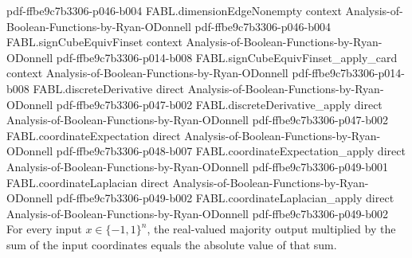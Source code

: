 \begin{theorem}
  {pdf-ffbe9c7b3306-p046-b004}
\proofstep
  {FABL.dimensionEdgeNonempty}
  {context}
  {Analysis-of-Boolean-Functions-by-Ryan-ODonnell}
  {pdf-ffbe9c7b3306-p046-b004}
\proofstep
  {FABL.signCubeEquivFinset}
  {context}
  {Analysis-of-Boolean-Functions-by-Ryan-ODonnell}
  {pdf-ffbe9c7b3306-p014-b008}
\proofstep
  {FABL.signCubeEquivFinset_apply_card}
  {context}
  {Analysis-of-Boolean-Functions-by-Ryan-ODonnell}
  {pdf-ffbe9c7b3306-p014-b008}
\proofstep
  {FABL.discreteDerivative}
  {direct}
  {Analysis-of-Boolean-Functions-by-Ryan-ODonnell}
  {pdf-ffbe9c7b3306-p047-b002}
\proofstep
  {FABL.discreteDerivative_apply}
  {direct}
  {Analysis-of-Boolean-Functions-by-Ryan-ODonnell}
  {pdf-ffbe9c7b3306-p047-b002}
\proofstep
  {FABL.coordinateExpectation}
  {direct}
  {Analysis-of-Boolean-Functions-by-Ryan-ODonnell}
  {pdf-ffbe9c7b3306-p048-b007}
\proofstep
  {FABL.coordinateExpectation_apply}
  {direct}
  {Analysis-of-Boolean-Functions-by-Ryan-ODonnell}
  {pdf-ffbe9c7b3306-p049-b001}
\proofstep
  {FABL.coordinateLaplacian}
  {direct}
  {Analysis-of-Boolean-Functions-by-Ryan-ODonnell}
  {pdf-ffbe9c7b3306-p049-b002}
\proofstep
  {FABL.coordinateLaplacian_apply}
  {direct}
  {Analysis-of-Boolean-Functions-by-Ryan-ODonnell}
  {pdf-ffbe9c7b3306-p049-b002}
For every input $x\in\{-1,1\}^n$, the real-valued majority output multiplied by the sum
of the input coordinates equals the absolute value of that sum.
\end{theorem}

